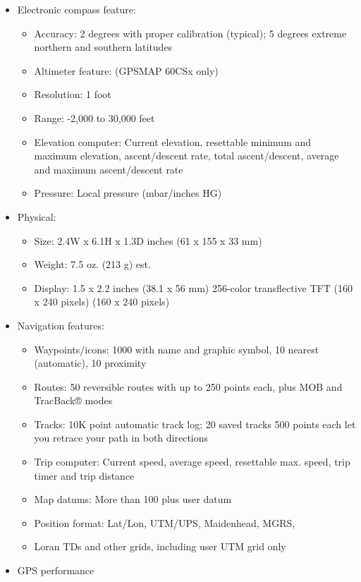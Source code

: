 \begin{itemize}
	\item Electronic compass feature:
		\begin{itemize}
			\item Accuracy: 2 degrees with proper calibration (typical); 5 degrees extreme northern and southern latitudes 
			\item Altimeter feature: (GPSMAP 60CSx only) 
			\item Resolution: 1 foot 
			\item Range: -2,000 to 30,000 feet 
			\item Elevation computer: Current elevation, resettable minimum and maximum elevation, ascent/descent rate, total ascent/descent, average and maximum ascent/descent rate 
			\item Pressure: Local pressure (mbar/inches HG) 
		\end{itemize}
	\item Physical:
		\begin{itemize}
			\item Size: 2.4W x 6.1H x 1.3D inches (61 x 155 x 33 mm) 
			\item Weight: 7.5 oz. (213 g) est. 
			\item Display: 1.5 x 2.2 inches (38.1 x 56 mm) 256-color transflective TFT (160 x 240 pixels) (160 x 240 pixels) 
  		\end{itemize}
	\item Navigation features:
		\begin{itemize}
			\item Waypoints/icons: 1000 with name and graphic symbol, 10 nearest (automatic), 10 proximity 
			\item Routes: 50 reversible routes with up to 250 points each, plus MOB and TracBack® modes 
			\item Tracks: 10K point automatic track log; 20 saved tracks 500 points each let you retrace your path in both directions
			\item Trip computer: Current speed, average speed, resettable max. speed, trip timer and trip distance 
			\item Map datums: More than 100 plus user datum 
			\item Position format: Lat/Lon, UTM/UPS, Maidenhead, MGRS, 
			\item Loran TDs and other grids, including user UTM grid only 
		\end{itemize}
	\item GPS performance 
		\begin{itemize}

\end{itemize}
\end{itemize}
